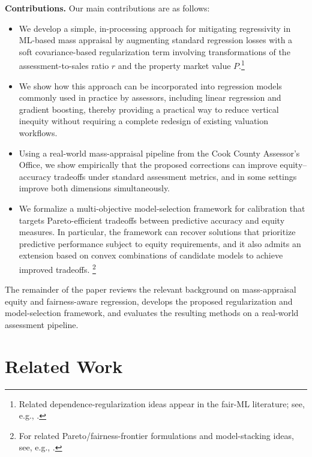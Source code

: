 \documentclass[12pt, draft]{article}
\theoremstyle{plain}
\theoremstyle{definition}
\newcommand{\1}{\mathbf{1}}
\begin{document}
\noindent \textbf{Contributions.} Our main contributions are as follows:
\begin{itemize}
    \item We develop a simple, in-processing approach for mitigating regressivity in ML-based mass appraisal by augmenting standard regression losses with a soft covariance-based regularization term involving transformations of the assessment-to-sales ratio $r$ and the property market value $P$.\footnote{Related dependence-regularization ideas appear in the fair-ML literature; see, e.g., \cite{lee2022maximal,LiEtAl2022Fairness,ScutariPaneroProissl2022}.}

    \item We show how this approach can be incorporated into regression models commonly used in practice by assessors, including linear regression and gradient boosting, thereby providing a practical way to reduce vertical inequity without requiring a complete redesign of existing valuation workflows.

    \item Using a real-world mass-appraisal pipeline from the Cook County Assessor's Office, we show empirically that the proposed corrections can improve equity--accuracy tradeoffs under standard assessment metrics, and in some settings improve both dimensions simultaneously.

    \item We formalize a multi-objective model-selection framework for calibration that targets Pareto-efficient tradeoffs between predictive accuracy and equity measures. In particular, the framework can recover solutions that prioritize predictive performance subject to equity requirements, and it also admits an extension based on convex combinations of candidate models to achieve improved tradeoffs. \footnote{For related Pareto/fairness-frontier formulations and model-stacking ideas, see, e.g., \cite{martinez2020minimax,little2022fairness}.}
\end{itemize}

The remainder of the paper reviews the relevant background on mass-appraisal equity and fairness-aware regression, develops the proposed regularization and model-selection framework, and evaluates the resulting methods on a real-world assessment pipeline.

\section{Related Work}
\end{document}
